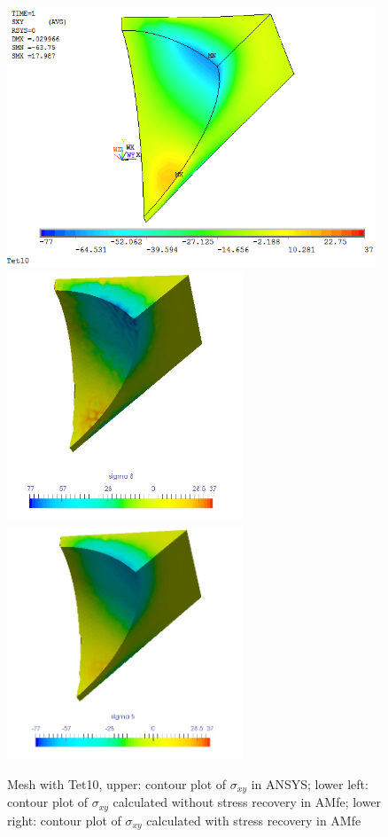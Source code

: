 \begin{figure}[htbp]
	\begin{center}
		\includegraphics[width=11cm,clip]{Tet10_Sxy.png} 	
		\includegraphics[width=7cm,clip]{Tet10_Sxy_PD.png} 		
		\includegraphics[width=7cm,clip]{Tet10_Sxy_P.png} 		
		\caption{Mesh with Tet10, upper: contour plot of $\sigma_{xy}$ in ANSYS; lower left: contour plot of $\sigma_{xy}$ calculated without stress recovery in AMfe; lower right: contour plot of $\sigma_{xy}$ calculated with stress recovery in AMfe} \label{fig: Tet10_Sxy}
	\end{center}
\end{figure}
\clearpage 

